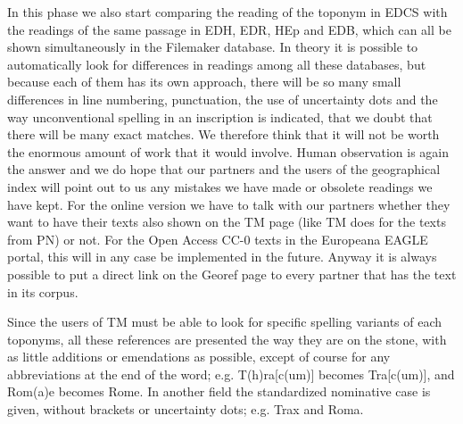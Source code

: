 \documentclass[amsthm,ebook]{saparticle}
\begin{document}
In this phase we also start comparing the reading of the toponym in EDCS with the readings of the same passage in
EDH, EDR, HEp and EDB, which can all be shown simultaneously in the Filemaker database. In theory it is possible to
automatically look for differences in readings among all these databases, but because each of them has its own
approach, there will be so many small differences in line numbering, punctuation, the use of uncertainty dots and the
way unconventional spelling in an inscription is indicated, that we doubt that there will be many exact matches. We
therefore think that it will not be worth the enormous amount of work that it would involve. Human observation is again
the answer and we do hope that our partners and the users of the geographical index will point out to us any mistakes
we have made or obsolete readings we have kept. For the online version we have to talk with our partners whether they
want to have their texts also shown on the TM page (like TM does for the texts from PN) or not. For the Open Access
CC-0 texts in the Europeana EAGLE portal, this will in any case be implemented in the future. Anyway it is always
possible to put a direct link on the Georef page to every partner that has the text in its corpus.


Since the users of TM must be able to look for specific spelling variants of each toponyms, all these references are
presented the way they are on the stone, with as little additions or emendations as possible, except of course for any
abbreviations at the end of the word; e.g. T(h)ra[c(um)] becomes Tra[c(um)], and Rom(a)e becomes Rome. In another field
the standardized nominative case is given, without brackets or uncertainty dots; e.g. Trax and Roma.
\end{document}

